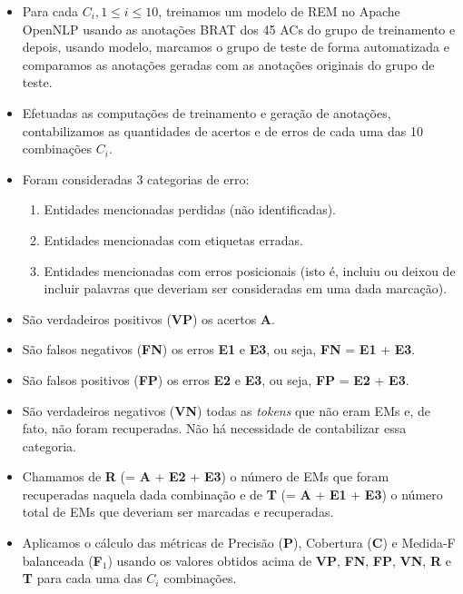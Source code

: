 \documentclass[11pt]{report}
\begin{document}
\begin{itemize}
  \item Para cada $C_i, 1 \leq i \leq 10$, treinamos um modelo de REM no Apache OpenNLP usando as anotações BRAT dos 45 ACs do grupo de treinamento e depois, usando modelo, marcamos
o grupo de teste de forma automatizada e comparamos as anotações geradas com as anotações originais do grupo de teste.
  \item Efetuadas as computações de treinamento e geração de anotações, contabilizamos as quantidades de acertos e de erros de cada uma das 10 combinações $C_i$.
  \item Foram consideradas 3 categorias de erro:
  \begin{enumerate}[label={\textbf{E\arabic*.}}]
    \item Entidades mencionadas perdidas (não identificadas).
    \item Entidades mencionadas com etiquetas erradas.
    \item Entidades mencionadas com erros posicionais (isto é, incluiu ou deixou de incluir palavras que deveriam ser consideradas em uma dada marcação).
  \end{enumerate}
  \item São verdadeiros positivos (\textbf{VP}) os acertos \textbf{A}.
  \item São falsos negativos (\textbf{FN}) os erros \textbf{E1} e \textbf{E3}, ou seja, \textbf{FN} = \textbf{E1} + \textbf{E3}.
  \item São falsos positivos (\textbf{FP}) os erros \textbf{E2} e \textbf{E3}, ou seja, \textbf{FP} = \textbf{E2} + \textbf{E3}.
  \item São verdadeiros negativos (\textbf{VN}) todas as \textit{tokens} que não eram EMs e, de fato, não foram recuperadas. Não há necessidade de contabilizar essa categoria.
  \item Chamamos de \textbf{R} (= \textbf{A} + \textbf{E2} + \textbf{E3}) o número de EMs que foram recuperadas naquela dada combinação e de \textbf{T} (= \textbf{A} + \textbf{E1} + \textbf{E3}) o número total de EMs que deveriam ser marcadas e recuperadas.
  \item Aplicamos o cálculo das métricas de Precisão (\textbf{P}), Cobertura (\textbf{C}) e Medida-F balanceada (\textbf{F$_1$}) usando os valores obtidos acima de \textbf{VP}, \textbf{FN}, \textbf{FP}, \textbf{VN}, \textbf{R} e \textbf{T} para cada uma das $C_i$ combinações.
\end{itemize}
\end{document}
